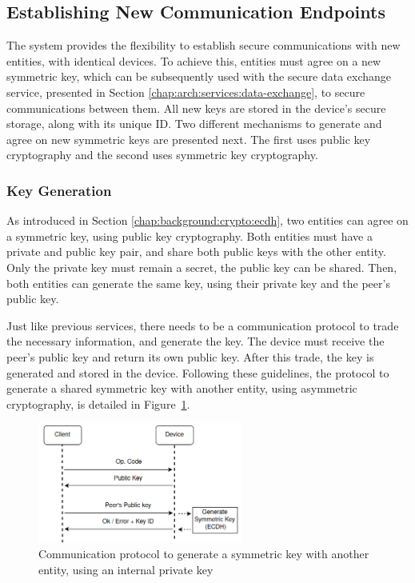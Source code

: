
\subsection{Establishing New Communication Endpoints}\label{chap:arch:services:new-comms}

The system provides the flexibility to establish secure communications with new entities, with identical devices.
To achieve this, entities must agree on a new symmetric key, which can be subsequently used with the secure data exchange service, presented in Section \ref{chap:arch:services:data-exchange}, to secure communications between them.
All new keys are stored in the device's secure storage, along with its unique ID.
Two different mechanisms to generate and agree on new symmetric keys are presented next. The first uses public key cryptography and the second uses symmetric key cryptography.

\subsubsection{Key Generation}\label{chap:arch:services:new-comms:ecdh}

As introduced in Section \ref{chap:background:crypto:ecdh}, two entities can agree on a symmetric key, using public key cryptography.
Both entities must have a private and public key pair, and share both public keys with the other entity. Only the private key must remain a secret, the public key can be shared. Then, both entities can generate the same key, using their private key and the peer's public key.

Just like previous services, there needs to be a communication protocol to trade the necessary information, and generate the key. The device must receive the peer's public key and return its own public key. After this trade, the key is generated and stored in the device. Following these guidelines, the protocol to generate a shared symmetric key with another entity, using asymmetric cryptography, is detailed in Figure~\ref{fig:protocol:ecdh}.
\begin{figure}[h!]
	\centering
	\includegraphics[width=0.60\textwidth]{./Images/ecdh.png}
	\caption{Communication protocol to generate a symmetric key with another entity, using an internal private key}
	\label{fig:protocol:ecdh}
\end{figure}

